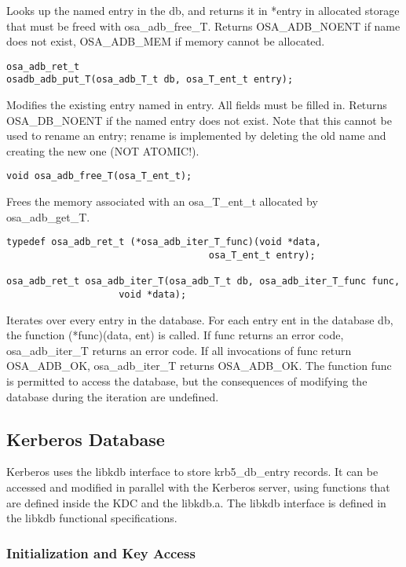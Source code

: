 Looks up the named entry in the db, and returns it in *entry in
allocated storage that must be freed with osa_adb_free_T.  Returns
OSA_ADB_NOENT if name does not exist, OSA_ADB_MEM if memory cannot be
allocated.

\begin{verbatim}
osa_adb_ret_t
osadb_adb_put_T(osa_adb_T_t db, osa_T_ent_t entry);
\end{verbatim}

Modifies the existing entry named in entry.  All fields must be filled
in.  Returns OSA_DB_NOENT if the named entry does not exist.  Note
that this cannot be used to rename an entry; rename is implemented by
deleting the old name and creating the new one (NOT ATOMIC!).

\begin{verbatim}
void osa_adb_free_T(osa_T_ent_t);
\end{verbatim}

Frees the memory associated with an osa_T_ent_t allocated by
osa_adb_get_T.

\begin{verbatim}
typedef osa_adb_ret_t (*osa_adb_iter_T_func)(void *data,
                                    osa_T_ent_t entry);

osa_adb_ret_t osa_adb_iter_T(osa_adb_T_t db, osa_adb_iter_T_func func, 
                    void *data);
\end{verbatim}

Iterates over every entry in the database.  For each entry ent in the
database db, the function (*func)(data, ent) is called.  If func
returns an error code, osa_adb_iter_T returns an error code.  If all
invocations of func return OSA_ADB_OK, osa_adb_iter_T returns
OSA_ADB_OK.  The function func is permitted to access the database,
but the consequences of modifying the database during the iteration
are undefined.

\subsection{Kerberos Database}

Kerberos uses the libkdb interface to store krb5_db_entry records.  It
can be accessed and modified in parallel with the Kerberos server,
using functions that are defined inside the KDC and the libkdb.a.  The
libkdb interface is defined in the libkdb functional specifications.

\subsubsection{Initialization and Key Access}

